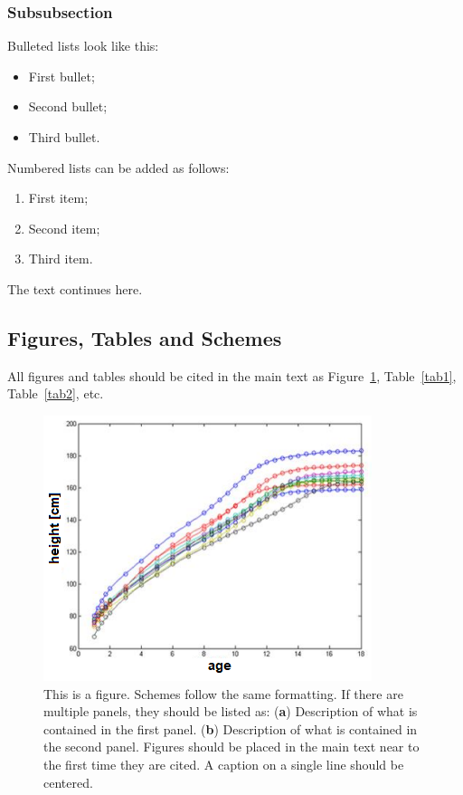 \documentclass[energies,article,submit,pdftex,moreauthors]{Definitions/mdpi}
\begin{document}
\subsubsection{Subsubsection}

Bulleted lists look like this:
\begin{itemize}
\item	First bullet;
\item	Second bullet;
\item	Third bullet.
\end{itemize}

Numbered lists can be added as follows:
\begin{enumerate}
\item	First item; 
\item	Second item;
\item	Third item.
\end{enumerate}

The text continues here. 

\subsection{Figures, Tables and Schemes}

All figures and tables should be cited in the main text as Figure~\ref{fig1}, Table~\ref{tab1}, Table~\ref{tab2}, etc.

\begin{figure}[H]
\includegraphics[width=10.5 cm]{images/berkeley}
\caption{This is a figure. Schemes follow the same formatting. If there are multiple panels, they should be listed as: (\textbf{a}) Description of what is contained in the first panel. (\textbf{b}) Description of what is contained in the second panel. Figures should be placed in the main text near to the first time they are cited. A caption on a single line should be centered.\label{fig1}}
\end{figure}   
\unskip
\end{document}
